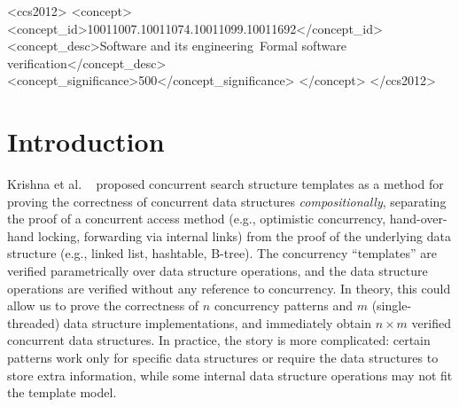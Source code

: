 \documentclass[sigplan,10pt, screen]{acmart}
\newcommand{\wm}[1]{\textbf{\textcolor{violet}{[William: #1]}}}
\begin{document}

\begin{CCSXML}
	<ccs2012>
	<concept>
	<concept_id>10011007.10011074.10011099.10011692</concept_id>
	<concept_desc>Software and its engineering~Formal software verification</concept_desc>
	<concept_significance>500</concept_significance>
	</concept>
	</ccs2012>
\end{CCSXML}



\maketitle

\section{Introduction}
\label{sec:introduction}
Krishna et al. ~\cite{templates} proposed concurrent search structure templates as a method for proving the correctness of concurrent data structures \emph{compositionally}, separating the proof of a concurrent access method (e.g., optimistic concurrency, hand-over-hand locking, forwarding via internal links) from the proof of the underlying data structure (e.g., linked list, hashtable, B-tree). The concurrency ``templates'' are verified parametrically over data structure operations, and the data structure operations are verified without any reference to concurrency. In theory, this could allow us to prove the correctness of $n$ concurrency patterns and $m$ (single-threaded) data structure implementations, and immediately obtain $n \times m$ verified concurrent data structures. In practice, the story is more complicated: certain patterns work only for specific data structures or require the data structures to store extra information, while some internal data structure operations may not fit the template model. %
\end{document}
